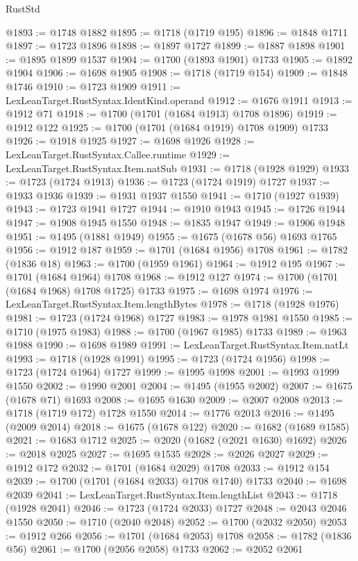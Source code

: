 \begin{lexlean}{RustStd}
\begin{coremodule}
@1893 := @1748 @1882
@1895 := @1718 (@1719 @195)
@1896 := @1848 @1711
@1897 := @1723 @1896
@1898 := @1897 @1727
@1899 := @1887 @1898
@1901 := @1895 @1899 @1537
@1904 := @1700 (@1893 @1901) @1733
@1905 := @1892 @1904
@1906 := @1698 @1905
@1908 := @1718 (@1719 @154)
@1909 := @1848 @1746
@1910 := @1723 @1909
@1911 := LexLeanTarget.RustSyntax.IdentKind.operand
@1912 := @1676 @1911
@1913 := @1912 @71
@1918 := @1700 (@1701 (@1684 @1913) @1708 @1896)
@1919 := @1912 @122
@1925 := @1700 (@1701 (@1684 @1919) @1708 @1909) @1733
@1926 := @1918 @1925
@1927 := @1698 @1926
@1928 := LexLeanTarget.RustSyntax.Callee.runtime
@1929 := LexLeanTarget.RustSyntax.Item.natSub
@1931 := @1718 (@1928 @1929)
@1933 := @1723 (@1724 @1913)
@1936 := @1723 (@1724 @1919) @1727
@1937 := @1933 @1936
@1939 := @1931 @1937 @1550
@1941 := @1710 (@1927 @1939)
@1943 := @1723 @1941 @1727
@1944 := @1910 @1943
@1945 := @1726 @1944
@1947 := @1908 @1945 @1550
@1948 := @1835 @1947
@1949 := @1906 @1948
@1951 := @1495 (@1881 @1949)
@1955 := @1675 (@1678 @56) @1693 @1765
@1956 := @1912 @187
@1959 := @1701 (@1684 @1956) @1708
@1961 := @1782 (@1836 @18)
@1963 := @1700 (@1959 @1961)
@1964 := @1912 @195
@1967 := @1701 (@1684 @1964) @1708
@1968 := @1912 @127
@1974 := @1700 (@1701 (@1684 @1968) @1708 @1725) @1733
@1975 := @1698 @1974
@1976 := LexLeanTarget.RustSyntax.Item.lengthBytes
@1978 := @1718 (@1928 @1976)
@1981 := @1723 (@1724 @1968) @1727
@1983 := @1978 @1981 @1550
@1985 := @1710 (@1975 @1983)
@1988 := @1700 (@1967 @1985) @1733
@1989 := @1963 @1988
@1990 := @1698 @1989
@1991 := LexLeanTarget.RustSyntax.Item.natLt
@1993 := @1718 (@1928 @1991)
@1995 := @1723 (@1724 @1956)
@1998 := @1723 (@1724 @1964) @1727
@1999 := @1995 @1998
@2001 := @1993 @1999 @1550
@2002 := @1990 @2001
@2004 := @1495 (@1955 @2002)
@2007 := @1675 (@1678 @71) @1693
@2008 := @1695 @1630
@2009 := @2007 @2008
@2013 := @1718 (@1719 @172) @1728 @1550
@2014 := @1776 @2013
@2016 := @1495 (@2009 @2014)
@2018 := @1675 (@1678 @122)
@2020 := @1682 (@1689 @1585)
@2021 := @1683 @1712
@2025 := @2020 (@1682 (@2021 @1630) @1692)
@2026 := @2018 @2025
@2027 := @1695 @1535
@2028 := @2026 @2027
@2029 := @1912 @172
@2032 := @1701 (@1684 @2029) @1708
@2033 := @1912 @154
@2039 := @1700 (@1701 (@1684 @2033) @1708 @1740) @1733
@2040 := @1698 @2039
@2041 := LexLeanTarget.RustSyntax.Item.lengthList
@2043 := @1718 (@1928 @2041)
@2046 := @1723 (@1724 @2033) @1727
@2048 := @2043 @2046 @1550
@2050 := @1710 (@2040 @2048)
@2052 := @1700 (@2032 @2050)
@2053 := @1912 @266
@2056 := @1701 (@1684 @2053) @1708
@2058 := @1782 (@1836 @56)
@2061 := @1700 (@2056 @2058) @1733
@2062 := @2052 @2061

\end{coremodule}
\end{lexlean}
